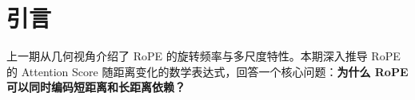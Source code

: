\section{引言}

上一期从几何视角介绍了 RoPE 的旋转频率与多尺度特性。本期深入推导 RoPE 的 Attention Score 随距离变化的数学表达式，回答一个核心问题：\textbf{为什么 RoPE 可以同时编码短距离和长距离依赖？}

